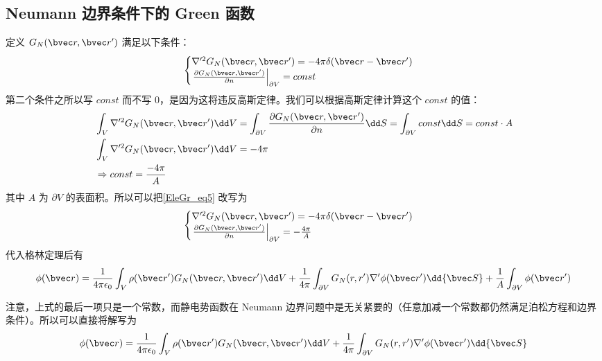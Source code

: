 \subsection{Neumann 边界条件下的 Green 函数}
定义 $G_N(\bvec r,\bvec r')$ 满足以下条件：
\begin{equation}\label{EleGr_eq5}
\begin{cases}
\nabla'^2G_N(\bvec r,\bvec r')=-4\pi\delta(\bvec r-\bvec r')\\
\left.\frac{\partial G_N(\bvec r,\bvec r')}{\partial n}\right|_{\partial V}=const
\end{cases}
\end{equation}
第二个条件之所以写 $const$ 而不写 $0$，是因为这将违反高斯定律。我们可以根据高斯定律计算这个 $const$ 的值：
\begin{equation}
\begin{aligned}
&\int_V \nabla'^2 G_N(\bvec r,\bvec r')\dd V=\int_{\partial V}\frac{\partial G_N(\bvec r,\bvec r')}{\partial n}\dd S=\int_{\partial V}const \dd S=const\cdot A\\
&\int_V \nabla'^2 G_N(\bvec r,\bvec r')\dd V=-4\pi\\
&\Rightarrow const=\frac{-4\pi}{A}
\end{aligned}
\end{equation}
其中 $A$ 为 $\partial V$ 的表面积。所以可以把\autoref{EleGr_eq5} 改写为
\begin{equation}
\begin{cases}
\nabla'^2G_N(\bvec r,\bvec r')=-4\pi\delta(\bvec r-\bvec r')\\
\left.\frac{\partial G_N(\bvec r,\bvec r')}{\partial n}\right|_{\partial V}=-\frac{4\pi}{A}
\end{cases}
\end{equation}
代入格林定理后有
\begin{equation}
\phi(\bvec r)=\frac{1}{4\pi\epsilon_0}\int_V \rho(\bvec r')G_N(\bvec r,\bvec r')\dd V+\frac{1}{4\pi}\int_{\partial V} G_N(r,r')\nabla'\phi(\bvec r')\dd {\bvec S}+\frac{1}{A}\int_{\partial V}\phi(\bvec r')
\end{equation}

注意，上式的最后一项只是一个常数，而静电势函数在 Neumann 边界问题中是无关紧要的（任意加减一个常数都仍然满足泊松方程和边界条件）。所以可以直接将解写为
\begin{equation}\label{EleGr_eq7}
\phi(\bvec r)=\frac{1}{4\pi\epsilon_0}\int_V \rho(\bvec r')G_N(\bvec r,\bvec r')\dd V+\frac{1}{4\pi}\int_{\partial V} G_N(r,r')\nabla'\phi(\bvec r')\dd {\bvec S}
\end{equation}

